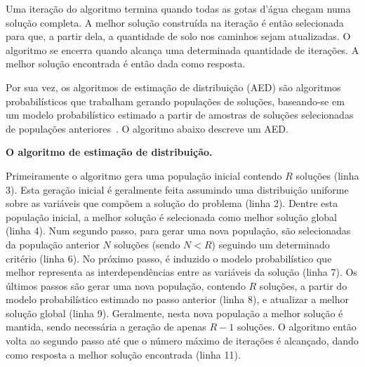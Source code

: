 \documentclass[brazil]{article}
\begin{document}
Uma iteração do algoritmo termina quando todas as gotas d'água chegam numa solução completa.
A melhor solução construída na iteração é então selecionada para que, a partir dela,
a quantidade de solo nos caminhos sejam atualizadas.
O algoritmo se encerra quando alcança uma determinada quantidade de iterações.
A melhor solução encontrada é então dada como resposta.

Por sua vez, os algoritmos de estimação de distribuição (AED) são algoritmos pro\-ba\-bi\-lís\-ti\-cos
que trabalham gerando populações de soluções, baseando-se em um modelo
probabilístico estimado a partir de amostras de soluções selecionadas de
populações anteriores~\cite{bengoetxeaPHD02}. O algoritmo abaixo descreve um AED.

\begin{algorithm}[H]
\DontPrintSemicolon
	\caption{\bf O algoritmo de estimação de distribuição.}\label{powermetalg}
\label{alg:aed}
\end{algorithm}

Primeiramente o algoritmo gera uma população inicial contendo $R$ soluções (linha 3).
Esta geração inicial é geralmente feita assumindo uma distribuição uniforme
sobre as variáveis que compõem a solução do problema (linha 2).
Dentre esta população inicial, a melhor solução é selecionada como melhor solução global (linha 4).
Num segundo passo, para gerar uma nova população, são selecionadas da população
anterior $N$ soluções (sendo $N < R$) seguindo um determinado critério (linha 6).
No próximo passo, é induzido o modelo probabilístico que melhor representa as
interdependências entre as variáveis da solução (linha 7).
Os últimos passos são gerar uma nova população, contendo $R$ soluções, a partir do modelo
probabilístico estimado no passo anterior (linha 8), e atualizar a melhor solução global (linha 9).
Geralmente, nesta nova população a melhor solução é mantida, sendo necessária
a geração de apenas $R-1$ soluções.
O algoritmo então volta ao segundo passo até que o número máximo de iterações é
alcançado, dando como resposta a melhor solução encontrada (linha 11).
\end{document}
